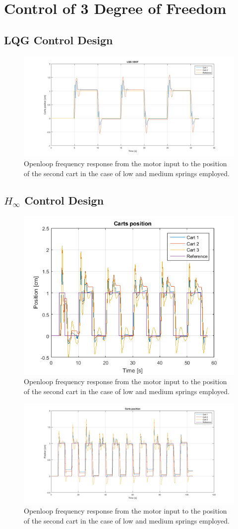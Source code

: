 \chapter{Control of 3 Degree of Freedom}
\section{LQG Control Design}
\begin{figure}[h]
\centering
\includegraphics[width=0.5\linewidth]{img/lqg.png}
\caption{Openloop frequency response from the motor input to the position of the second cart in the case of low and medium springs employed.}
\label{fig:lqg3dof}
\end{figure}
\section{$H_\infty$ Control Design}
\begin{figure}[h]
\centering
\includegraphics[width=0.5\linewidth]{img/hinf1.png}
\caption{Openloop frequency response from the motor input to the position of the second cart in the case of low and medium springs employed.}
\label{fig:hinf13dof}
\end{figure}
\begin{figure}[h]
\centering
\includegraphics[width=0.5\linewidth]{img/hinf2.png}
\caption{Openloop frequency response from the motor input to the position of the second cart in the case of low and medium springs employed.}
\label{fig:hinf23dof}
\end{figure}